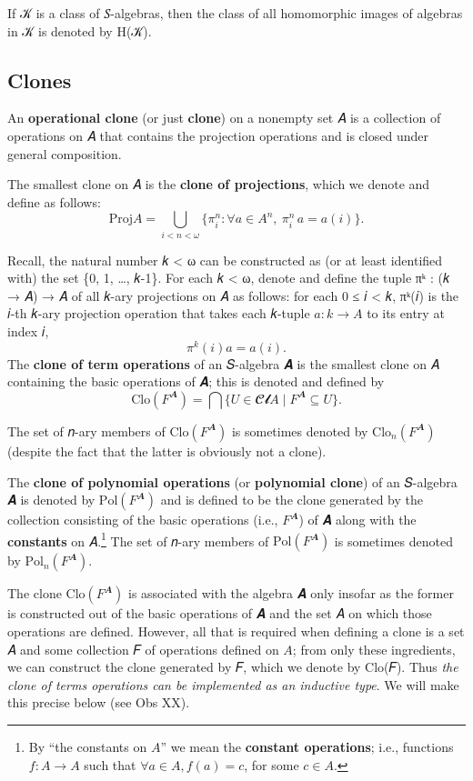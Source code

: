 \documentclass[sigplan,screen]{acmart}
\begin{document}
If 𝒦 is a class of 𝑆-algebras, then the class of all homomorphic images of algebras in 𝒦 is denoted by H(𝒦).

\subsection{Clones}\label{clones}
An \textbf{operational clone} (or just \textbf{clone}) on a nonempty set 𝐴 is a collection of operations on 𝐴 that contains the projection operations and is closed under general composition.

The smallest clone on 𝐴 is the \textbf{clone of projections}, which we denote and define as follows:
\[\mathrm{Proj}  A = ⋃_{i < n < ω}  \{π^n_i : ∀ a ∈ A^n,\ π^n_i\, a = a(i)\}.\]

Recall, the natural number 𝑘 \textless{} ω can be constructed as (or at least identified with) the set \{0, 1, …, 𝑘-1\}. For each 𝑘 \textless{} ω, denote and define the tuple πᵏ : (𝑘 → 𝐴) → 𝐴 of all 𝑘-ary projections on 𝐴 as follows: for each 0 ≤ 𝑖 \textless{} 𝑘, πᵏ(𝑖) is the 𝑖-th 𝑘-ary projection operation that takes each 𝑘-tuple \(𝑎 : 𝑘 → 𝐴\) to its
entry at index 𝑖, \[π^k (i) a = a(i).\]
The \textbf{clone of term operations} of an 𝑆-algebra 𝑨 is the smallest clone on 𝐴 containing the basic operations of 𝑨; this is denoted and defined by \[\mathrm{Clo}(F^{𝑨}) = ⋂ \{ U ∈ 𝓒𝓵 A ∣ F^{𝑨} ⊆ U\}.\]

The set of 𝑛-ary members of \(\mathrm{Clo}(F^{𝑨})\) is sometimes denoted by \(\mathrm{Clo}_n (F^{𝑨})\) (despite the fact that the latter is obviously not a clone).

The \textbf{clone of polynomial operations} (or \textbf{polynomial clone}) of an 𝑆-algebra 𝑨 is denoted by \(\mathrm{Pol} (F^{𝑨})\) and is defined to be the clone generated by the collection consisting of the basic operations (i.e., \(F^{𝑨}\)) of 𝑨 along with the \textbf{constants} on 𝐴.\footnote{By ``the constants on \(A\)'' we mean the \textbf{constant operations}; i.e., functions \(f: A → A\) such that \(∀ a ∈ A, f(a) = c\), for some \(c ∈ A\).} The set of 𝑛-ary members of \(\mathrm{Pol} (F^{𝑨})\) is sometimes denoted by \(\mathrm{Pol}_n (F^{𝑨})\).

The clone \(\mathrm{Clo}(F^{𝑨})\) is associated with the algebra 𝑨 only insofar as the former is constructed out of the basic operations of 𝑨 and the set 𝐴 on which those operations are defined. However, all that is required when defining a clone is a set 𝐴 and some collection 𝐹 of operations defined on \(A\); from only these ingredients, we can construct the clone generated by 𝐹, which we denote by Clo(𝐹). Thus \emph{the clone of terms operations can be implemented as an inductive type}. We will make this precise below (see Obs XX). %
\end{document}
